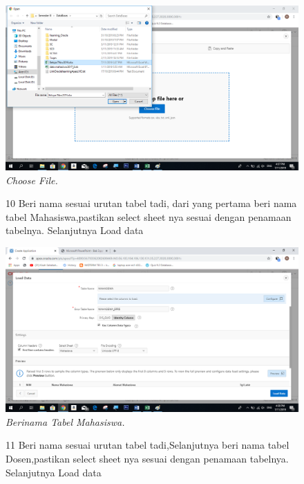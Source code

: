 \begin{enumerate}
\begin{figure}
    \begin{center}
    \includegraphics[scale=0.4]{figures/9.png}
    \caption{\textit{Choose File.}}
     \end{center}
    \label{gambar}
    \end{figure}

\begin{figure}
\item[10]Beri nama sesuai urutan tabel tadi, dari yang pertama beri nama tabel Mahasiswa,pastikan select sheet nya sesuai dengan penamaan tabelnya. Selanjutnya Load data

    \begin{center}
    \includegraphics[scale=0.4]{figures/10.png}
    \caption{\textit{Berinama Tabel Mahasiswa.}}
    \end{center}
    \label{gambar}
    \end{figure}

\begin{figure}
\item[11]Beri nama sesuai urutan tabel tadi,Selanjutnya beri nama tabel Dosen,pastikan select sheet nya sesuai dengan penamaan tabelnya. Selanjutnya Load data


\end{figure}
\end{enumerate}
